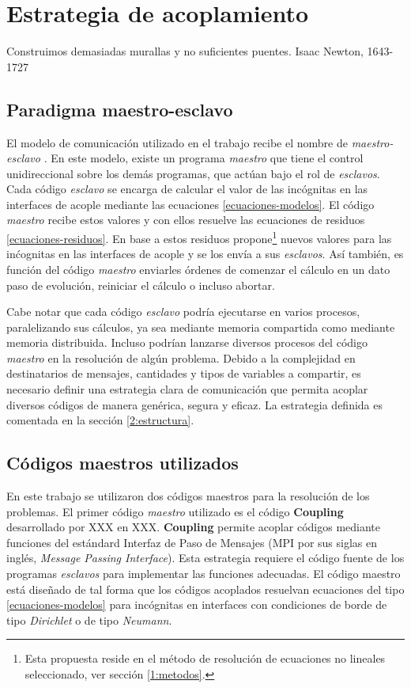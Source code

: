 \chapter{Estrategia de acoplamiento}
\label{chap2}
\chapterquote
{Construimos demasiadas murallas y no suficientes puentes.}
{Isaac Newton, 1643-1727}

\section{Paradigma maestro-esclavo}
\label{2:maestro-esclavo}

El modelo de comunicación utilizado en el trabajo recibe el nombre de \textit{maestro-esclavo} \cite{maestro-esclavo}.
En este modelo, existe un programa \textit{maestro} que tiene el control unidireccional sobre los demás programas, que actúan bajo el rol de \textit{esclavos}.
Cada código \textit{esclavo} se encarga de calcular el valor de las incógnitas en las interfaces de acople mediante las ecuaciones \ref{ecuaciones-modelos}.
El código \textit{maestro} recibe estos valores y con ellos resuelve las ecuaciones de residuos \ref{ecuaciones-residuos}.
En base a estos residuos propone\footnote{
Esta propuesta reside en el método de resolución de ecuaciones no lineales seleccionado, ver sección \ref{1:metodos}.
} nuevos valores para las inćognitas en las interfaces de acople y se los envía a sus \textit{esclavos}.
Así también, es función del código \textit{maestro} enviarles órdenes de comenzar el cálculo en un dato paso de evolución, reiniciar el cálculo o incluso abortar.

Cabe notar que cada código \textit{esclavo} podría ejecutarse en varios procesos, paralelizando sus cálculos,
ya sea mediante memoria compartida como mediante memoria distribuida.
Incluso podrían lanzarse diversos procesos del código \textit{maestro} en la resolución de algún problema.
Debido a la complejidad en destinatarios de mensajes, cantidades y tipos de variables a compartir,
es necesario definir una estrategia clara de comunicación
que permita acoplar diversos códigos de manera genérica, segura y eficaz.
La estrategia definida es comentada en la sección \ref{2:estructura}.

\section{Códigos maestros utilizados}
\label{2:maestros}

En este trabajo se utilizaron dos códigos maestros para la resolución de los problemas.
El primer código \textit{maestro} utilizado es el código \textbf{Coupling} desarrollado por XXX en XXX.
\textbf{Coupling} permite acoplar códigos mediante funciones del estándard Interfaz de Paso de Mensajes (MPI por sus siglas en inglés, \textit{Message Passing Interface}).
Esta estrategia requiere el código fuente de los programas \textit{esclavos} para implementar las funciones adecuadas.
El código maestro está diseñado de tal forma que los códigos acoplados resuelvan ecuaciones del tipo \ref{ecuaciones-modelos}
para incógnitas en interfaces con condiciones de borde de tipo \textit{Dirichlet} o de tipo \textit{Neumann}.

